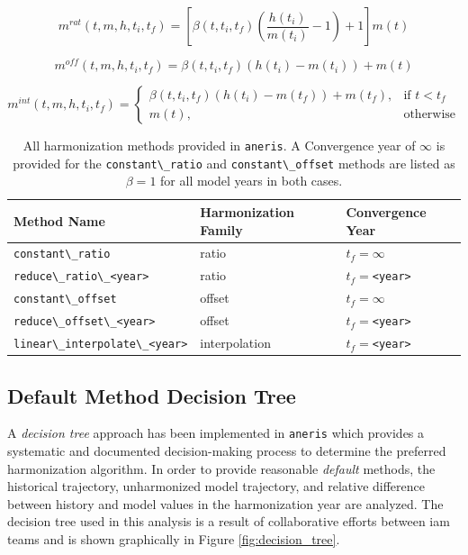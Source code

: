 \documentclass[review]{elsarticle}
\newcommand{\code}[1]{\lstinline[basicstyle=\ttfamily\color{black}]|#1|}
\newcommand{\codeb}[1]{\texttt{#1}}
\begin{document}
\begin{equation}\label{eqs:ratio}
  m^{rat}(t, m, h, t_i, t_f) = [\beta(t, t_i, t_f) (\frac{h(t_i)}{m(t_i)} - 1) + 1] m(t)
\end{equation}

\begin{equation}\label{eqs:offset}
  m^{off}(t, m, h, t_i, t_f) = \beta(t, t_i, t_f) (h(t_i) - m(t_i)) + m(t)
\end{equation}
  
\begin{equation}\label{eqs:interpolate}
  m^{int}(t, m, h, t_i, t_f) =
  \begin{cases}
    \beta(t, t_i, t_f) (h(t_i) - m(t_f)) + m(t_f), & \text{if } t < t_f\\
    m(t), & \text{otherwise}
  \end{cases}
\end{equation}


\begin{table}[h!]
\centering
\caption{All harmonization methods provided in \code{aneris}. A Convergence year of $\infty$ is provided for the \code{constant\_ratio} and \code{constant\_offset} methods are listed as $\beta = 1$ for all model years in both cases.}
\label{tab:meths}
\begin{tabular}{|l|l|l|}
\hline
Method Name                             & Harmonization Family & Convergence Year\\
\hline
\code{constant\_ratio}                  & ratio              & $t_f = \infty$\\
\code{reduce\_ratio\_<year>}            & ratio              & $t_f = $\code{<year>}\\
\code{constant\_offset}                 & offset             & $t_f = \infty$\\
\code{reduce\_offset\_<year>}           & offset             & $t_f = $\code{<year>}\\
\code{linear\_interpolate\_<year>}      & interpolation      & $t_f = $\code{<year>}\\
\hline
\end{tabular}
\end{table}

\subsection{Default Method Decision Tree}\label{sec:tree}

A \textit{decision tree} approach has been implemented in \codeb{aneris} which
provides a systematic and documented decision-making process to determine the
preferred harmonization algorithm. In order to provide reasonable
\textit{default} methods, the historical trajectory, unharmonized model
trajectory, and relative difference between history and model values in the
harmonization year are analyzed. The decision tree used in this analysis is a
result of collaborative efforts between \gls{iam} teams and is shown graphically in
Figure \ref{fig:decision_tree}.
\end{document}
